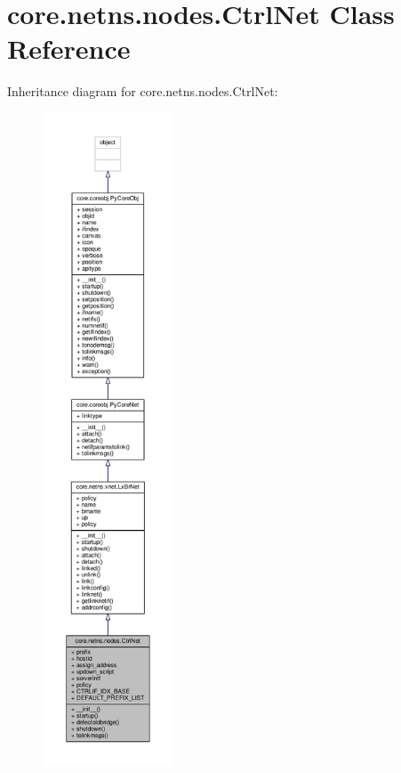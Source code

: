 \hypertarget{classcore_1_1netns_1_1nodes_1_1_ctrl_net}{\section{core.\+netns.\+nodes.\+Ctrl\+Net Class Reference}
\label{classcore_1_1netns_1_1nodes_1_1_ctrl_net}
}


Inheritance diagram for core.\+netns.\+nodes.\+Ctrl\+Net\+:
\nopagebreak
\begin{figure}[H]
\begin{center}
\leavevmode
\includegraphics[height=550pt]{classcore_1_1netns_1_1nodes_1_1_ctrl_net__inherit__graph}
\end{center}
\end{figure}


